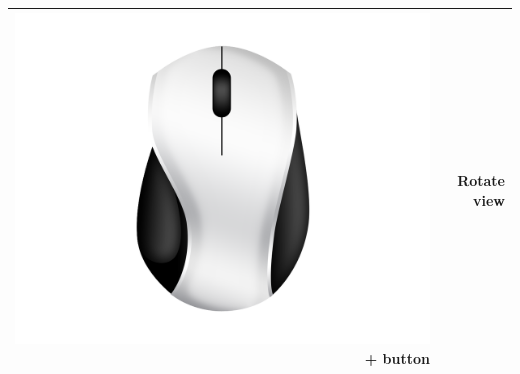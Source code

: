 \documentclass[11pt,a4paper]{report}
\begin{document}
\begin{table}[htbp]
\begin{tabular}{rr}
    \midrule
          \includegraphics[width=\buttonsize\textwidth]{ButtonMouse} + button & Rotate view \\
    \bottomrule
    \end{tabular}%
  \label{tab:controls}%
\end{table}%
\end{document}
